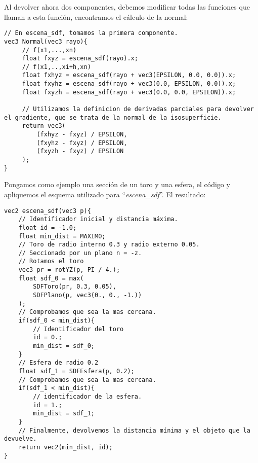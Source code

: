 Al devolver ahora dos componentes, debemos modificar todas las funciones que llaman a esta función, encontramos el cálculo de la normal:

\begin{lstlisting}
// En escena_sdf, tomamos la primera componente.
vec3 Normal(vec3 rayo){
     // f(x1,...,xn)
     float fxyz = escena_sdf(rayo).x;
     // f(x1,..,xi+h,xn)
     float fxhyz = escena_sdf(rayo + vec3(EPSILON, 0.0, 0.0)).x;
     float fxyhz = escena_sdf(rayo + vec3(0.0, EPSILON, 0.0)).x;
     float fxyzh = escena_sdf(rayo + vec3(0.0, 0.0, EPSILON)).x;
     
     // Utilizamos la definicion de derivadas parciales para devolver el gradiente, que se trata de la normal de la isosuperficie.
     return vec3(
         (fxhyz - fxyz) / EPSILON,
         (fxyhz - fxyz) / EPSILON,
         (fxyzh - fxyz) / EPSILON
     );
}
\end{lstlisting}

Pongamos como ejemplo una sección de un toro y una esfera, el código y apliquemos el esquema utilizado para \enquote{\textit{escena\_sdf}}. El resultado:

\begin{lstlisting}
vec2 escena_sdf(vec3 p){
    // Identificador inicial y distancia máxima.
    float id = -1.0;
    float min_dist = MAXIMO;
    // Toro de radio interno 0.3 y radio externo 0.05.
    // Seccionado por un plano n = -z.
    // Rotamos el toro 
    vec3 pr = rotYZ(p, PI / 4.);
    float sdf_0 = max(
        SDFToro(pr, 0.3, 0.05),
        SDFPlano(p, vec3(0., 0., -1.))
    );
    // Comprobamos que sea la mas cercana.
    if(sdf_0 < min_dist){
        // Identificador del toro
        id = 0.;
        min_dist = sdf_0;
    }
    // Esfera de radio 0.2
    float sdf_1 = SDFEsfera(p, 0.2);
    // Comprobamos que sea la mas cercana.
    if(sdf_1 < min_dist){
        // identificador de la esfera.
        id = 1.;
        min_dist = sdf_1;
    }
    // Finalmente, devolvemos la distancia mínima y el objeto que la devuelve.
    return vec2(min_dist, id);
}
\end{lstlisting}


